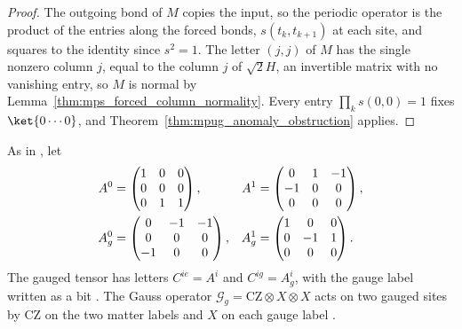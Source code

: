 \begin{proof}\leanok
    The outgoing bond of $M$ copies the input, so the periodic operator is the
    product of the entries along the forced bonds, $s(t_k,t_{k+1})$ at each
    site, and squares to the identity since $s^2=1$. The letter $(j,j)$ of $M$
    has the single nonzero column $j$, equal to the column $j$ of $\sqrt2H$, an
    invertible matrix with no vanishing entry, so $M$ is normal by
    Lemma~\ref{thm:mps_forced_column_normality}. Every entry
    $\prod_ks(0,0)=1$ fixes $\ket{0\cdots0}$, and
    Theorem~\ref{thm:mpug_anomaly_obstruction} applies.
\end{proof}

\begin{definition}
    \label{def:mpug_controlled_z_defect}
    \leanok
    As in \cite[lines~3874--3896]{FrancoRubio2025MPUGauging}, let
    \begin{align}
        A^0   & =\begin{pmatrix}1&0&0\\0&0&0\\0&1&1\end{pmatrix},    &
        A^1   & =\begin{pmatrix}0&1&-1\\-1&0&0\\0&0&0\end{pmatrix},
        \notag                                                         \\
        A_g^0 & =\begin{pmatrix}0&-1&-1\\0&0&0\\-1&0&0\end{pmatrix}, &
        A_g^1 & =\begin{pmatrix}1&0&0\\0&-1&1\\0&0&0\end{pmatrix}.
        \notag
    \end{align}
    The gauged tensor has letters $C^{ie}=A^i$ and $C^{ig}=A_g^i$, with the
    gauge label written as a bit \cite[line~3966]{FrancoRubio2025MPUGauging}.
    The Gauss operator $\mathcal G_g=\mathrm{CZ}\otimes X\otimes X$ acts on two
    gauged sites by $\mathrm{CZ}$ on the two matter labels and $X$ on each
    gauge label \cite[line~3968]{FrancoRubio2025MPUGauging}.
\end{definition}

